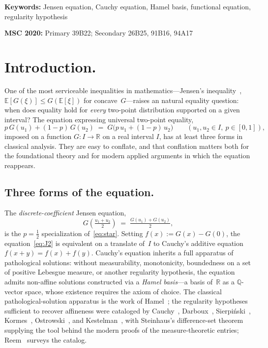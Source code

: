 \documentclass{article}
\theoremstyle{plain}
\theoremstyle{definition}
\newcommand{\R}{\mathbb{R}}
\newcommand{\Q}{\mathbb{Q}}
\newcommand{\E}{\mathbb{E}}
\begin{document}
\vspace{8px}

\noindent\textbf{Keywords:} Jensen equation, Cauchy equation, Hamel basis,
functional equation, regularity hypothesis

\vspace{4px}

\noindent\textbf{MSC 2020:} Primary 39B22; Secondary 26B25, 91B16, 94A17

\vspace{8px}

\section{Introduction.}
\label{sec:intro}

One of the most serviceable inequalities in mathematics---Jensen's
inequality~\cite{Jensen1906}, $\E[G(\xi)]\le G(\E[\xi])$ for concave~$G$---raises an
natural equality question: when does equality hold for \emph{every} two-point
distribution supported on a given interval? The equation expressing
universal two-point equality,
\begin{equation}
p\,G(u_1)+(1-p)\,G(u_2) \;=\; G\bigl(p\,u_1+(1-p)\,u_2\bigr)
\qquad (u_1,u_2\in I,\ p\in[0,1]),
\tag{$\star$}\label{eq:star}
\end{equation}
imposed on a function $G\colon I\to\R$ on a real interval $I$, has
at least three forms in classical analysis. They are easy to conflate, and that conflation matters both for the foundational theory and for modern applied arguments in which the equation reappears.

\subsection{Three forms of the equation.}

The \emph{discrete-coefficient} Jensen equation,
\begin{equation}
G\!\left(\tfrac{u_1+u_2}{2}\right) \;=\; \tfrac{G(u_1)+G(u_2)}{2},
\tag{$J_2$}\label{eq:J2}
\end{equation}
is the $p=\tfrac{1}{2}$ specialization of~\eqref{eq:star}. Setting
$f(x):=G(x)-G(0)$, the equation~\eqref{eq:J2} is equivalent on a
translate of~$I$ to Cauchy's additive equation $f(x+y)=f(x)+f(y)$.
Cauchy's equation inherits a full apparatus of pathological solutions:
without measurability, monotonicity, boundedness on a set of positive
Lebesgue measure, or another regularity hypothesis, the equation admits
non-affine solutions constructed via a \emph{Hamel basis}---a basis
of~$\R$ as a $\Q$-vector space, whose existence requires the axiom of
choice. The classical pathological-solution apparatus is the work of
Hamel~\cite{Hamel1905}; the regularity hypotheses sufficient to recover
affineness were cataloged by Cauchy~\cite{Cauchy1821},
Darboux~\cite{Darboux1875,Darboux1880}, Sierpi\'nski~\cite{Sierpinski1920},
Kormes~\cite{Kormes1926}, Ostrowski~\cite{Ostrowski1929}, and
Kestelman~\cite{Kestelman1947}, with Steinhaus's difference-set
theorem~\cite{Steinhaus1920} supplying the tool behind the modern
proofs of the measure-theoretic entries; Reem~\cite{Reem2017} surveys
the catalog.
\end{document}
